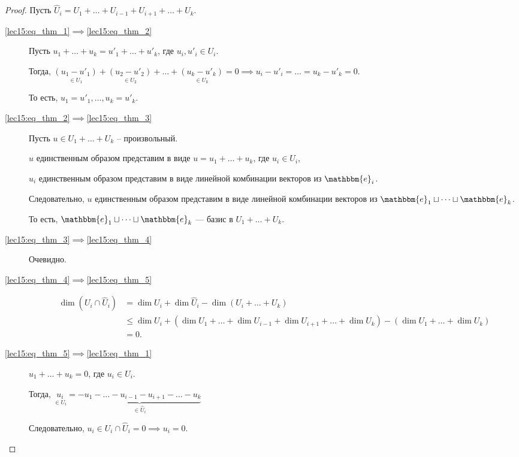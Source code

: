 \begin{proof}
    \newcommand\E{\mathbbm{e}}
    Пусть $\widehat{U}_i = U_1 + \dots + U_{i - 1} + U_{i + 1} + \dots + U_k$.

    \begin{description}
    \item[\ref{lec15:eq_thm_1}$\implies$\ref{lec15:eq_thm_2}]
        Пусть $u_1 + \dots + u_k = u'_1 + \dots + u'_k$, где $u_i, u'_i \in U_i$.

        Тогда, $\underset{\in U_1}{(u_1 - u'_1)} + \underset{\in U_2}{(u_2 - u'_2)} + \dots + \underset{\in U_k}{(u_k - u'_k)} = 0 \implies u_i - u'_i = \dots = u_k - u'_k = 0$.

        То есть, $u_1 = u'_1, \dots, u_k = u'_k$.

    \item[\ref{lec15:eq_thm_2}$\implies$\ref{lec15:eq_thm_3}]
        Пусть $u \in U_1 + \dots + U_k$ -- произвольный.

        $u$ единственным образом представим в виде $u = u_1 + \dots + u_k$, где $u_i \in U_i$,

        $u_i$ единственным образом представим в виде линейной комбинации векторов из $\E_i$.
 
        Следовательно, $u$ единственным образом представим в виде линейной комбинации векторов из $\E_1 \sqcup \dots \sqcup \E_k$.

        То есть, $\E_1 \sqcup \dots \sqcup \E_k$ --- базис в $U_1 + \dots + U_k$.

    \item[\ref{lec15:eq_thm_3}$\implies$\ref{lec15:eq_thm_4}]
        Очевидно. 

    \item[\ref{lec15:eq_thm_4}$\implies$\ref{lec15:eq_thm_5}]
        \begin{align*}
            \dim (U_i \cap \widehat{U}_i) 
            &= \dim U_i + \dim \widehat{U}_i - \dim (U_i + \dots + U_k) \\
            &\leq \dim U_i + (\dim U_1 + \dots + \dim U_{i - 1} + \dim U_{i + 1} + \dots + \dim U_k) - (\dim U_1 + \dots + \dim U_k) \\
            &= 0
        .\end{align*}

    \item[\ref{lec15:eq_thm_5}$\implies$\ref{lec15:eq_thm_1}]
        $u_1 + \dots + u_k = 0$, где $u_i \in U_i$.

        Тогда, $\underset{\in U_i}{u_i} = \underbrace{-u_1 - \dots - u_{i - 1} - u_{i + 1} - \dots - u_k}_{\in \widehat{U}_i}$

        Следовательно, $u_i \in U_i \cap \widehat{U}_i = 0 \implies u_i = 0$.
        \qedhere
    \end{description}
\end{proof}

